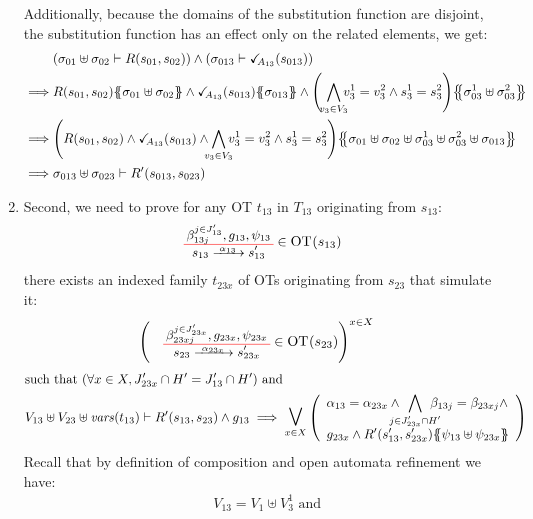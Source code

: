 \documentclass[runningheads]{llncs}
\begin{document}
\begin{enumerate}
Additionally, because  the domains of the substitution function are disjoint, the substitution function has an effect only on the related elements,  we get:
\begin{align*}
& \mpar{\sigma_{01} \uplus \sigma_{02} \vdash R\mpar{s_{01}, s_{02}}} \wedge 
\mpar{\sigma_{013} \vdash \reach{A_{13}}\mpar{s_{013}}}\\
\implies & R\mpar{s_{01}, s_{02}}\psubst{ \sigma_{01} \uplus \sigma_{02}} \wedge \reach{A_{13}}\mpar{s_{013}} \psubst{\sigma_{013}} \land \mpar{\,\,\bigwedge_\subbox{v_3\in V_3} v^1_3=v^2_3\wedge s^1_3 = s^2_3}\psubst{\sigma_{03}^1 \uplus \sigma_{03}^2 }\\
\implies & \mpar{R\mpar{s_{01}, s_{02}} \wedge \reach{A_{13}}\mpar{s_{013}}  \wedge \bigwedge_\subbox{v_3\in V_3}  v^1_3=v^2_3\wedge s^1_3 = s^2_3} \psubst{ \sigma_{01} \uplus \sigma_{02} \uplus \sigma^1_{03}\uplus \sigma^2_{03}\uplus \sigma_{013} }\\
\implies & \sigma_{013} \uplus \sigma_{023} \vdash R'\mpar{s_{013}, s_{023}}
\end{align*}
\item Second, we need to prove for any OT $t_{13}$ in $T_{13}$ originating from $s_{13}$:
\begin{align*}
		&  \OTx{13}{}{13}{13} \in \fOT{s_{13}}
\end{align*}		
there exists an indexed family $t_{23x}$ of OTs originating from $s_{23}$ that simulate it: 
\begin{align*}
		&  \mpar{\OTx{23}{x}{23x}{23x} \in \fOT{s_{23}}}^{x \in X}
\end{align*}	
\begin{align*}		
		& \text{such that } \mpar{\forall x \in X, J'_{23x} \cap H' = J'_{13} \cap H'} \text{ and }\\
		&  V_{13} \uplus V_{23} \uplus \fvars{t_{13}} \vdash R'\mpar{s_{13}, s_{23}} \wedge g_{13} \implies \operatorname*{\bigsymb{\bigvee}}_{x \in X} \mpar{\everymath{\displaystyle}\begin{array}{l}
			\alpha_{13} = \alpha_{23x} \wedge \bigwedge_\subbox{j \in J'_{23x} \cap H'} \beta_{13j} = \beta_{23xj} \wedge\\[12pt]
			 g_{23x} \wedge R'\mpar{s'_{13}, s'_{23x}}\psubst{\psi_{13} \uplus \psi_{23x}}
		\end{array}} 
	\end{align*}
Recall that by definition of composition and open automata refinement we have: 
\begin{align*}
&V_{13}= V_1\uplus V^1_3 \text{ and }

\end{align*}
\end{enumerate}
\end{document}
